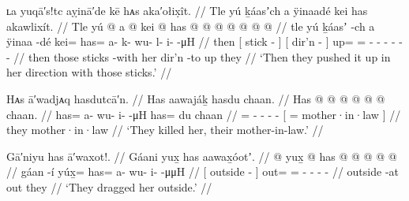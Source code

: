 \ex\label{ex:92-134-pushed-back-with-sticks}%
%
\begingl
	\glpreamble	ʟa yuqā′s!tc aỵinā′de kē hᴀs aka′ołix̣ît. //
	\glpreamble	Tle yú ḵáasʼch a ÿinaadé kei has akawlixít. //
	\gla	Tle {} yú  @ {} {}
		{} a  @ {} {}
		kei @ has @  @ {} @ {} @ {} @ {} @ {} @ {} //
	\glb	tle {} yú ḵáasʼ -ch {}
		{} a ÿinaa -dé {}
		kei= has= a- k- wu- l- i-  -μH //
	\glc	then {}[  stick - {}]
		{}[  dir’n - {}]
		up= = - - - - -
			 - //
	\gld	then {} those sticks -with {}
		{} her dir’n -to {}
		up they\•  {} {} {} {} {} {} //
	\glft	‘Then they pushed it up in her direction with those sticks.’
		//
\endgl
\xe

\ex\label{ex:92-135-killed-mother-in-law}%
%
\begingl
	\glpreamble	Hᴀs ā′wadjᴀq hasdutcā′n. //
	\glpreamble	Has aawajáḵ hasdu chaan. //
	\gla	Has @  @ {} @ {} @ {} @ {}
		{}  @ {} chaan. {} //
	\glb	has= a- wu- i-  -μH
		{} has= du chaan {} //
	\glc	{}= - - -  -
		{}[ =  mother·in·law {}] //
	\gld	they  {} {} {} {}
		{}  {} mother·in·law {} //
	\glft	‘They killed her, their mother-in-law.’
		//
\endgl
\xe

\ex\label{ex:92-136-drag-outside}%
%
\begingl
	\glpreamble	Gā′niyu has ā′waxot!. //
	\glpreamble	Gáani yux̱ has aawax̱óotʼ. //
	\gla	{}  @ {} {}
		yux̱ @ has @  @ {} @ {} @ {} @ {} //
	\glb	{} gáan -í {}
		yúx̱= has= a- wu- i-  -μμH //
	\glc	{}[ outside - {}]
		out= = - - -  - //
	\gld	{} outside -at {}
		out they\•  {} {} {} {} //
	\glft	‘They dragged her outside.’
		//
\endgl
\xe


